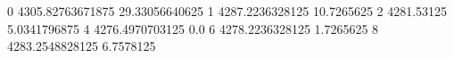 0 4305.82763671875 29.33056640625
1 4287.2236328125 10.7265625
2 4281.53125 5.0341796875
4 4276.4970703125 0.0
6 4278.2236328125 1.7265625
8 4283.2548828125 6.7578125
